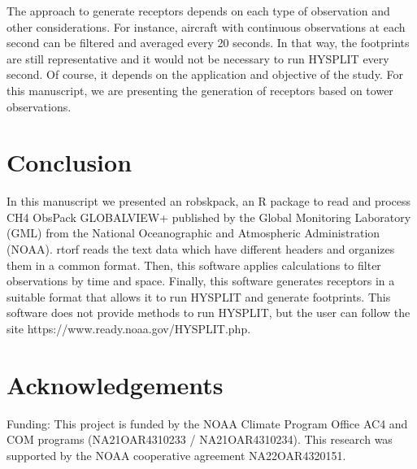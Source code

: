 \documentclass[preprint, 3p,
authoryear]{elsarticle} %
\begin{document}
The approach to generate receptors depends on each type of observation
and other considerations. For instance, aircraft with continuous
observations at each second can be filtered and averaged every 20
seconds. In that way, the footprints are still representative and it
would not be necessary to run HYSPLIT every second. Of course, it
depends on the application and objective of the study. For this
manuscript, we are presenting the generation of receptors based on tower
observations.

\hypertarget{conclusion}{%
\section{Conclusion}\label{conclusion}}

In this manuscript we presented an robskpack, an R package to read and
process CH4 ObsPack GLOBALVIEW+ published by the Global Monitoring
Laboratory (GML) from the National Oceanographic and Atmospheric
Administration (NOAA). rtorf reads the text data which have different
headers and organizes them in a common format. Then, this software
applies calculations to filter observations by time and space. Finally,
this software generates receptors in a suitable format that allows it to
run HYSPLIT and generate footprints. This software does not provide
methods to run HYSPLIT, but the user can follow the site
https://www.ready.noaa.gov/HYSPLIT.php.

\hypertarget{acknowledgements}{%
\section{Acknowledgements}\label{acknowledgements}}

Funding: This project is funded by the NOAA Climate Program Office AC4
and COM programs (NA21OAR4310233 / NA21OAR4310234). This research was
supported by the NOAA cooperative agreement NA22OAR4320151.

\renewcommand\refname{References}

\end{document}
